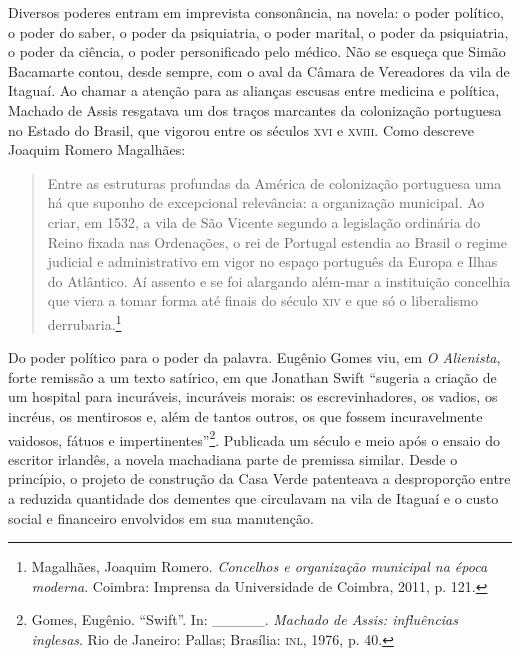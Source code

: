Diversos poderes entram em imprevista consonância, na novela: o poder
político, o poder do saber, o poder da psiquiatria, o poder marital, o
poder da psiquiatria, o poder da ciência, o poder personificado pelo
médico. Não se esqueça que Simão Bacamarte contou, desde sempre, com o
aval da Câmara de Vereadores da vila de Itaguaí. Ao chamar a atenção
para as alianças escusas entre medicina e política, Machado de Assis
resgatava um dos traços marcantes da colonização portuguesa no Estado do
Brasil, que vigorou entre os séculos \textsc{xvi} e \textsc{xviii}. Como descreve Joaquim
Romero Magalhães:

\begin{quote}
Entre as estruturas profundas da América de colonização portuguesa uma
há que suponho de excepcional relevância: a organização municipal. Ao
criar, em 1532, a vila de São Vicente segundo a legislação ordinária do
Reino fixada nas Ordenações, o rei de Portugal estendia ao Brasil o
regime judicial e administrativo em vigor no espaço português da Europa
e Ilhas do Atlântico. Aí assento e se foi alargando além-mar a
instituição concelhia que viera a tomar forma até finais do século \textsc{xiv} e
que só o liberalismo derrubaria.\footnote{Magalhães, Joaquim Romero.
  \emph{Concelhos e organização municipal na época moderna}. Coimbra:
  Imprensa da Universidade de Coimbra, 2011, p. 121.}
\end{quote}

Do poder político para o poder da palavra. Eugênio Gomes viu, em \emph{O
Alienista}, forte remissão a um texto satírico, em que Jonathan Swift
``sugeria a criação de um hospital para incuráveis, incuráveis morais:
os escrevinhadores, os vadios, os incréus, os mentirosos e, além de
tantos outros, os que fossem incuravelmente vaidosos, fátuos e
impertinentes''\footnote{Gomes, Eugênio. ``Swift''. In: \_\_\_\_\_.
  \emph{Machado de Assis: influências inglesas}. Rio de Janeiro: Pallas;
  Brasília: \textsc{inl}, 1976, p. 40.}. Publicada um século e meio após o ensaio
do escritor irlandês, a novela machadiana parte de premissa similar.
Desde o princípio, o projeto de construção da Casa Verde patenteava a
desproporção entre a reduzida quantidade dos dementes que circulavam na
vila de Itaguaí e o custo social e financeiro envolvidos em sua
manutenção.

